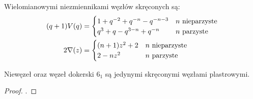 \begin{proposition}
    Wielomianowymi niezmiennikami węzłów skręconych są:
    \begin{align*}
    (q+1)V(q) & = \begin{cases}
        1+q^{-2}+q^{-n}-q^{-n-3} & n \mbox{ nieparzyste} \\
        q^{3}+q-q^{3-n}+q^{-n} & n \mbox{ parzyste}
    \end{cases} \\
    2 \nabla (z) & = \begin{cases}
        (n+1) z^{2} + 2 & n \mbox{ nieparzyste} \\
        2 - nz^2 & n \mbox{ parzyste}
    \end{cases}
    \end{align*}
\end{proposition}

\begin{proposition}
    Niewęzeł oraz węzeł dokerski $6_1$ są jedynymi skręconymi węzłami plastrowymi.
\end{proposition}

\begin{proof}
    \cite{casson86}.
\end{proof}

